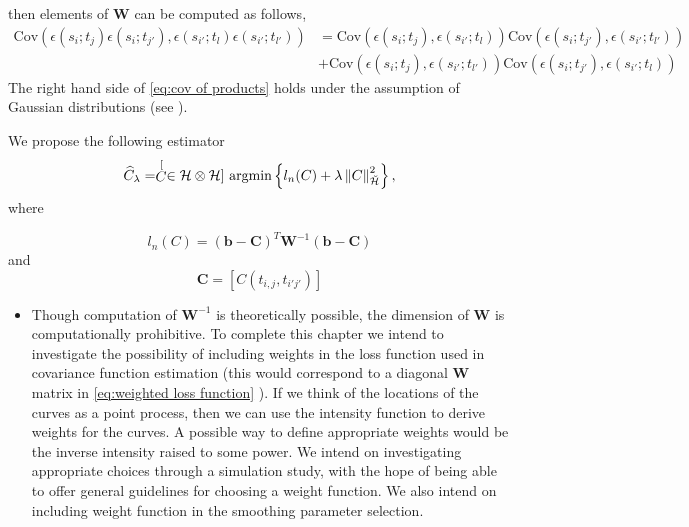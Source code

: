 then elements of $\mathbf{W}$ can be computed as follows,
\begin{align} 
	\text{Cov}(\epsilon(s_i; t_{j}) \epsilon(s_i;t_{j'}), \epsilon(s_{i'}; t_{l}) \epsilon(s_{i'};t_{l'}) ) 
	&= 
	  \text{Cov}(\epsilon(s_i; t_{j}), \epsilon(s_{i'}; t_{l}))\text{Cov}( \epsilon(s_i;t_{j'}), \epsilon(s_{i'};t_{l'})  ) \nonumber \\
	&+
		 \text{Cov}(\epsilon(s_i; t_{j}),  \epsilon(s_{i'};t_{l'}) )\text{Cov}(\epsilon(s_i;t_{j'}), \epsilon(s_{i'}; t_{l})) \label{eq:cov of products}
\end{align}
The right hand side of \eqref{eq:cov of products} holds under the assumption of Gaussian distributions (see \cite{Bohrnstedt:2010ud}). 

We propose the following estimator
\[
\widehat{C}_{\lambda}=\stackrel[C \in \mathcal{H}\otimes \mathcal{H}]{}{\text{ argmin}} \left\{ l_{n}(C)+\lambda\left\Vert C\right\Vert _{\breve{\mathcal{H}}}^{2} \right\},
\]
 where

\begin{equation}
l_{n}(C)= (\mathbf{b} - \mathbf{C})^T\mathbf{W}^{-1}(\mathbf{b} - \mathbf{C})
\label{eq:weighted loss function}
\end{equation}
and 
\[
\mathbf{C} = [C(t_{i,j}, t_{i'j'})]
\]


\begin{itemize}
\item Though computation of $\mathbf{W}^{-1}$ is theoretically possible, the dimension of $\mathbf{W}$ is computationally prohibitive. To complete this chapter we intend to investigate the possibility of including weights in the loss function used in covariance function estimation (this would correspond to a diagonal $\mathbf{W}$ matrix in \eqref{eq:weighted loss function} ). If we think of the locations of the curves as a point process, then we can use the intensity function to derive weights for the curves.  A possible way to define appropriate weights would be the inverse intensity raised to some power. We intend on investigating appropriate choices through a simulation study, with the hope of being able to offer general guidelines for  choosing a weight function. We also intend on including weight function in the smoothing parameter selection. 
\end{itemize}


